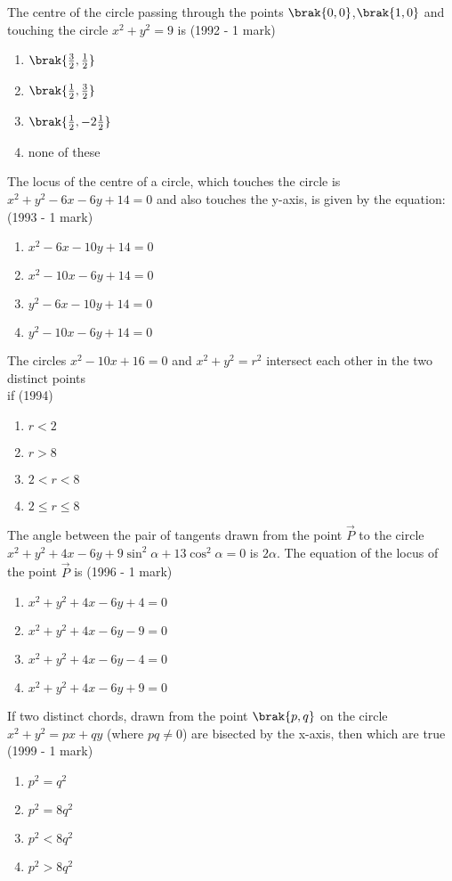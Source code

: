     \item The centre of the circle passing through the points $\brak{0,0}$,$\brak{1,0}$ and touching the circle $x^{2}+y^{2}=9$ is
    \hfill {(1992 - 1 mark)}
    \begin{enumerate}
    	\item $\brak{\frac{3}{2},\frac{1}{2}}$
    	\item $\brak{\frac{1}{2},\frac{3}{2}}$
    	\item $\brak{\frac{1}{2},-2\frac{1}{2}}$
    	\item none of these
    \end{enumerate}
    \item The locus of the centre of a circle, which touches the circle is $x^{2}+y^{2}-6x-6y+14=0$ and also touches the y-axis, is given by the equation: \hfill {(1993 - 1 mark)}
    \begin{enumerate}
    	\item $x^{2}-6x-10y+14=0$
    	\item $x^{2}-10x-6y+14=0$
    	\item $y^{2}-6x-10y+14=0$
    	\item $y^{2}-10x-6y+14=0$
    \end{enumerate}
    \item The circles $x^{2}-10x+16=0$ and $x^{2}+y^{2}=r^{2}$ intersect each other in the two distinct points\\ if
    \hfill {(1994)}
    \begin{enumerate}
    	\item $r<2$
    	\item $r>8$
    	\item $2<r<8$
    	\item $2\leq r\leq8$
    \end{enumerate}
    \item The angle between the pair of tangents drawn from the point $\vec{P}$ to the circle $x^{2}+y^{2}+4x-6y+9\sin^{2}{\alpha}+13\cos^{2}{\alpha}=0$ is $2\alpha$. The equation of the locus of the point $\vec{P}$ is
    \hfill {(1996 - 1 mark)}
    \begin{enumerate}
    	\item $x^{2}+y^{2}+4x-6y+4=0$
    	\item $x^{2}+y^{2}+4x-6y-9=0$
    	\item $x^{2}+y^{2}+4x-6y-4=0$
    	\item $x^{2}+y^{2}+4x-6y+9=0$
    \end{enumerate}
    \item If two distinct chords, drawn from the point $\brak{p,q}$ on the circle $x^{2}+y^{2}=px+qy$ (where $pq \neq 0$) are bisected by the x-axis, then which are true
    \hfill {(1999 - 1 mark)}
    \begin{enumerate}
    	\item $p^{2}=q^{2}$
    	\item $p^{2}=8q^{2}$ 
    	\item $p^{2}<8q^{2}$
    	\item $p^{2}>8q^{2}$
    \end{enumerate}
    
%
